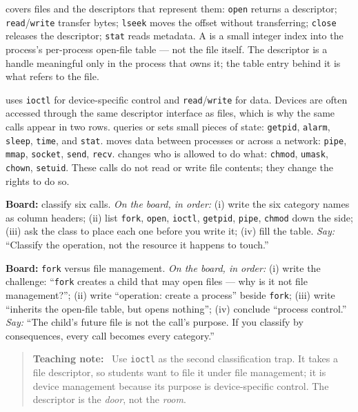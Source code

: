 \documentclass[11pt]{article}
\newenvironment{teachingaside}{\begin{quote}\small\color{primary-gold}\textbf{Teaching note:}\ }{\end{quote}}
\begin{document}
 covers files and the descriptors that represent them: \texttt{open} returns a descriptor; \texttt{read}/\texttt{write} transfer bytes; \texttt{lseek} moves the offset without transferring; \texttt{close} releases the descriptor; \texttt{stat} reads metadata. A  is a small integer index into the process's per-process open-file table --- not the file itself. The descriptor is a handle meaningful only in the process that owns it; the table entry behind it is what refers to the file.

 uses \texttt{ioctl} for device-specific control and \texttt{read}/\texttt{write} for data. Devices are often accessed through the same descriptor interface as files, which is why the same calls appear in two rows.  queries or sets small pieces of state: \texttt{getpid}, \texttt{alarm}, \texttt{sleep}, \texttt{time}, and \texttt{stat}.  moves data between processes or across a network: \texttt{pipe}, \texttt{mmap}, \texttt{socket}, \texttt{send}, \texttt{recv}.  changes who is allowed to do what: \texttt{chmod}, \texttt{umask}, \texttt{chown}, \texttt{setuid}. These calls do not read or write file contents; they change the rights to do so.

\textbf{Board:} classify six calls. \emph{On the board, in order:} (i) write the six category names as column headers; (ii) list \texttt{fork}, \texttt{open}, \texttt{ioctl}, \texttt{getpid}, \texttt{pipe}, \texttt{chmod} down the side; (iii) ask the class to place each one before you write it; (iv) fill the table. \emph{Say:} ``Classify the operation, not the resource it happens to touch.''

\textbf{Board:} \texttt{fork} versus file management. \emph{On the board, in order:} (i) write the challenge: ``\texttt{fork} creates a child that may open files --- why is it not file management?''; (ii) write ``operation: create a process'' beside \texttt{fork}; (iii) write ``inherits the open-file table, but opens nothing''; (iv) conclude ``process control.'' \emph{Say:} ``The child's future file is not the call's purpose. If you classify by consequences, every call becomes every category.''

\begin{teachingaside}
Use \texttt{ioctl} as the second classification trap. It takes a file descriptor, so students want to file it under file management; it is device management because its purpose is device-specific control. The descriptor is the \emph{door}, not the \emph{room}.
\end{teachingaside}
\end{document}
